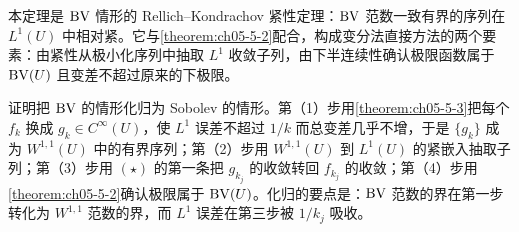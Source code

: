 \documentclass[../../main.tex]{subfiles}%
\begin{document}
\begin{remark}\label{remark:ch05-thm-5-5-动机}
本定理是 $\mathrm{BV}$ 情形的 Rellich--Kondrachov 紧性定理：$\mathrm{BV}$ 范数一致有界的序列在 $L^1(U)$ 中相对紧。它与\cref{theorem:ch05-5-2}配合，构成变分法直接方法的两个要素：由紧性从极小化序列中抽取 $L^1$ 收敛子列，由下半连续性确认极限函数属于 $\mathrm{BV}(U)$ 且变差不超过原来的下极限。%

证明把 $\mathrm{BV}$ 的情形化归为 Sobolev 的情形。第（1）步用\cref{theorem:ch05-5-3}把每个 $f_k$ 换成 $g_k\in C^{\infty}(U)$，使 $L^1$ 误差不超过 $1/k$ 而总变差几乎不增，于是 $\{g_k\}$ 成为 $W^{1,1}(U)$ 中的有界序列；第（2）步用 $W^{1,1}(U)$ 到 $L^1(U)$ 的紧嵌入抽取子列；第（3）步用 $(\star)$ 的第一条把 $g_{k_j}$ 的收敛转回 $f_{k_j}$ 的收敛；第（4）步用\cref{theorem:ch05-5-2}确认极限属于 $\mathrm{BV}(U)$。化归的要点是：$\mathrm{BV}$ 范数的界在第一步转化为 $W^{1,1}$ 范数的界，而 $L^1$ 误差在第三步被 $1/k_j$ 吸收。%
\end{remark}
\end{document}
